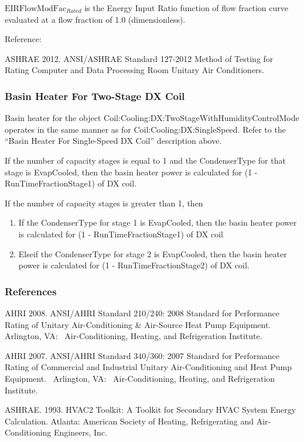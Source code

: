 \(\mathrm{EIRFlowModFac}_{Rated}\) is the Energy Input Ratio function of flow fraction curve evaluated at a flow fraction of 1.0 (dimensionless).

Reference:

ASHRAE 2012. ANSI/ASHRAE Standard 127-2012 Method of Testing for Rating Computer and Data Processing Room Unitary Air Conditioners.

\subsubsection{Basin Heater For Two-Stage DX Coil}\label{basin-heater-for-two-stage-dx-coil}

Basin heater for the object Coil:Cooling:DX:TwoStageWithHumidityControlMode operates in the same manner as for Coil:Cooling:DX:SingleSpeed. Refer to the ``Basin Heater For Single-Speed DX Coil'' description above.

If the number of capacity stages is equal to 1 and the CondenserType for that stage is EvapCooled, then the basin heater power is calculated for (1 - RunTimeFractionStage1) of DX coil.

If the number of capacity stages is greater than 1, then

\begin{enumerate}
\item If the CondenserType for stage 1 is EvapCooled, then the basin heater power is calculated for (1 - RunTimeFractionStage1) of DX coil
\item Elseif the CondenserType for stage 2 is EvapCooled, then the basin heater power is calculated for (1 - RunTimeFractionStage2) of DX coil.
\end{enumerate}

\subsubsection{References}\label{references-2-002}

AHRI 2008. ANSI/AHRI Standard 210/240: 2008 Standard for Performance Rating of Unitary Air-Conditioning \& Air-Source Heat Pump Equipment.~ Arlington, VA:~ Air-Conditioning, Heating, and Refrigeration Institute.

AHRI 2007. ANSI/AHRI Standard 340/360: 2007 Standard for Performance Rating of Commercial and Industrial Unitary Air-Conditioning and Heat Pump Equipment.~ Arlington, VA:~ Air-Conditioning, Heating, and Refrigeration Institute.

ASHRAE. 1993. HVAC2 Toolkit: A Toolkit for Secondary HVAC System Energy Calculation. Atlanta: American Society of Heating, Refrigerating and Air-Conditioning Engineers, Inc.

